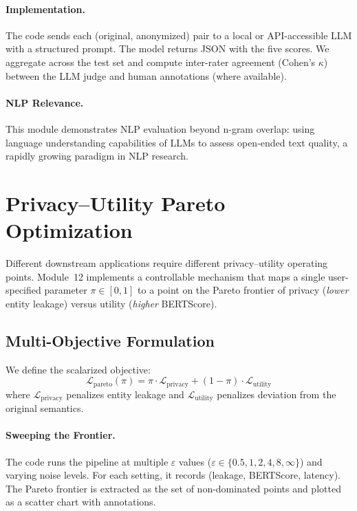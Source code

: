 \documentclass[11pt, a4paper]{article}
\begin{document}
\paragraph{Implementation.}
The code sends each (original, anonymized) pair to a local or API-accessible LLM with a structured prompt.  The model returns JSON with the five scores.  We aggregate across the test set and compute inter-rater agreement (Cohen's $\kappa$) between the LLM judge and human annotations (where available).

\paragraph{NLP Relevance.}
This module demonstrates NLP evaluation beyond n-gram overlap: using language understanding capabilities of LLMs to assess open-ended text quality, a rapidly growing paradigm in NLP research.


\section{Privacy--Utility Pareto Optimization}
\label{sec:pareto}

Different downstream applications require different privacy--utility operating points.  Module~12 implements a controllable mechanism that maps a single user-specified parameter $\pi \in [0,1]$ to a point on the Pareto frontier of privacy (\emph{lower} entity leakage) versus utility (\emph{higher} BERTScore).

\subsection{Multi-Objective Formulation}

We define the scalarized objective:
\[
  \mathcal{L}_{\text{pareto}}(\pi) = \pi \cdot \mathcal{L}_{\text{privacy}} + (1-\pi) \cdot \mathcal{L}_{\text{utility}}
\]
where $\mathcal{L}_{\text{privacy}}$ penalizes entity leakage and $\mathcal{L}_{\text{utility}}$ penalizes deviation from the original semantics.

\paragraph{Sweeping the Frontier.}
The code runs the pipeline at multiple $\varepsilon$ values ($\varepsilon \in \{0.5, 1, 2, 4, 8, \infty\}$) and varying noise levels.  For each setting, it records (leakage, BERTScore, latency).  The Pareto frontier is extracted as the set of non-dominated points and plotted as a scatter chart with annotations.
\end{document}
